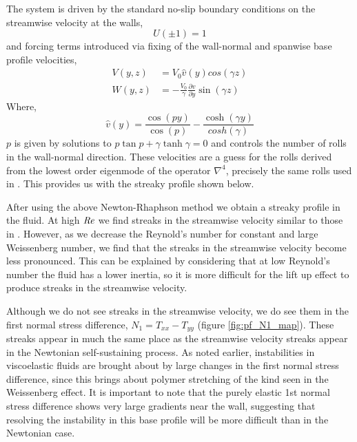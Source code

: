 \documentclass{jfm}
\newcommand{\dy}[1]{\frac{\partial #1}{\partial y}}
\newcommand\Rey{\mbox{\textit{Re}}}  %
\begin{document}
The system is driven by the standard no-slip boundary conditions on the
streamwise velocity at the walls,
\begin{equation}
    U(\pm 1) = 1
\end{equation}
and forcing terms introduced via fixing of the wall-normal and spanwise base
profile velocities,
\begin{align}
    V(y,z) &= V_0 \hat{v}(y) cos(\gamma z) \\
    W(y,z) &= -\frac{V_0}{\gamma} \dy{\hat{v}} \sin(\gamma z) 
\end{align}
Where,
\begin{equation}
    \hat{v}(y) = \frac{\cos(py)}{\cos(p)} - \frac{\cosh(\gamma y)}{cosh(\gamma)} 
\end {equation}
$p$ is given by solutions to $p\tan p + \gamma \tanh \gamma = 0$ and controls
the number of rolls in the wall-normal direction. These velocities are a guess
for the rolls derived from the lowest order eigenmode of the operator
$\nabla^{4}$, precisely the same rolls used in \cite{Waleffe1997}. This provides
us with the streaky profile shown below.

After using the above Newton-Rhaphson method we obtain a streaky profile in the
fluid. At high $\Rey$ we find streaks in the streamwise velocity similar to
those in \cite{Waleffe1997}. However, as we decrease the Reynold's number for
constant and large Weissenberg number, we find that the streaks in the
streamwise velocity become less pronounced. This can be explained by
considering that at low Reynold's number the fluid has a lower inertia, so it
is more difficult for the lift up effect to produce streaks in the streamwise
velocity. 

Although we do not see streaks in the streamwise velocity, we do see them in
the first normal stress difference, $N_{1} = T_{xx} - T_{yy}$ (figure
\ref{fig:pf_N1_map}). These streaks appear in much the same place as the
streamwise velocity streaks appear in the Newtonian self-sustaining process. As
noted earlier, instabilities in viscoelastic fluids are brought about by large
changes in the first normal stress difference, since this brings about polymer
stretching of the kind seen in the Weissenberg effect. It is important to note
that the purely elastic 1st normal stress difference shows very large gradients
near the wall, suggesting that resolving the instability in this base profile
will be more difficult than in the Newtonian case.

\end{document}
